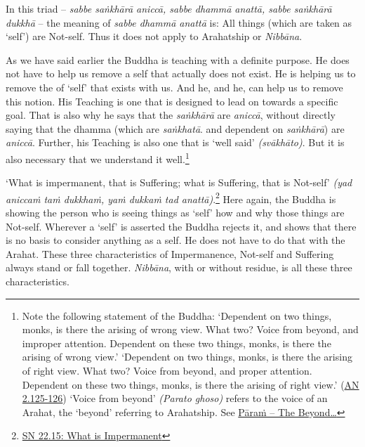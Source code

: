 In this triad -- \emph{sabbe saṅkhārā aniccā, sabbe dhammā anattā, sabbe saṅkhārā dukkhā} -- the meaning of \emph{sabbe dhammā anattā} is: All things (which are taken as `self') are Not-self. Thus it does not apply to Arahatship or \emph{Nibbāna}.

As we have said earlier the Buddha is teaching with a definite purpose. He does not have to help us remove a self that actually does not exist. He is helping us to remove the  of `self' that exists with us. And he, and  he, can help us to remove this notion. His Teaching is one that is designed to lead on towards a specific goal. That is also why he says that the \emph{saṅkhārā} are \emph{aniccā}, without directly saying that the dhamma (which are \emph{saṅkhatā}. and dependent on \emph{saṅkhārā}) are \emph{aniccā}. Further, his Teaching is also one that is `well said' \emph{(svākhāto)}. But it is also necessary that we understand it well.\footnote{Note the following statement of the Buddha: `Dependent on two things, monks, is there the arising of wrong view. What two? Voice from beyond, and improper attention. Dependent on these two things, monks, is there the arising of wrong view.' `Dependent on two things, monks, is there the arising of right view. What two? Voice from beyond, and proper attention. Dependent on these two things, monks, is there the arising of right view.' (\href{https://suttacentral.net/an2.118-129/en/sujato}{AN 2.125-126}) `Voice from beyond' \emph{(Parato ghoso)} refers to the voice of an Arahat, the `beyond' referring to Arahatship. See \protect\hyperlink{beyond}{Pāraṁ -- The Beyond\ldots\hspace{0pt}}}

`What is impermanent, that is Suffering; what is Suffering, that is Not-self' \emph{(yad aniccaṁ taṁ dukkhaṁ, yaṁ dukkaṁ tad anattā)}.\footnote{\href{https://suttacentral.net/sn22.15/en/bodhi}{SN 22.15: What is Impermanent}} Here again, the Buddha is showing the person who is seeing things as `self' how and why those things are Not-self. Wherever a `self' is asserted the Buddha rejects it, and shows that there is no basis to consider anything as a self. He does not have to do that with the Arahat. These three characteristics of Impermanence, Not-self and Suffering always stand or fall together. \emph{Nibbāna}, with or without residue, is  all these three characteristics.
